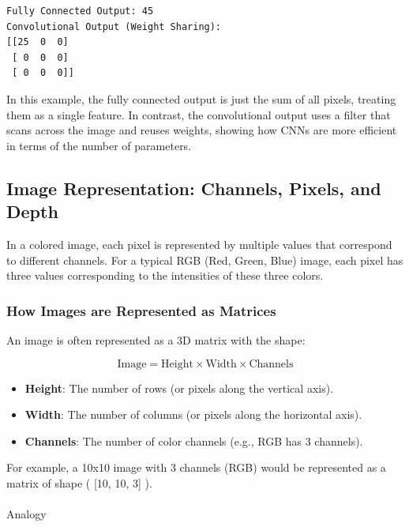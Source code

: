 \documentclass[
  letterpaper,
  DIV=11,
  numbers=noendperiod]{scrreprt}
\makeatletter
\let\oldparagraph\paragraph
\renewcommand{\paragraph}{
    \@ifstar
      \xxxParagraphStar
      \xxxParagraphNoStar
  }
\newcommand{\xxxParagraphStar}[1]{\oldparagraph*{#1}\mbox{}}
\newcommand{\xxxParagraphNoStar}[1]{\oldparagraph{#1}\mbox{}}
\providecommand{\tightlist}{%
  \setlength{\itemsep}{0pt}\setlength{\parskip}{0pt}}\usepackage{longtable,booktabs,array}
\makeatother
\begin{document}
\begin{verbatim}
Fully Connected Output: 45
Convolutional Output (Weight Sharing):
[[25  0  0]
 [ 0  0  0]
 [ 0  0  0]]
\end{verbatim}

In this example, the fully connected output is just the sum of all
pixels, treating them as a single feature. In contrast, the
convolutional output uses a filter that scans across the image and
reuses weights, showing how CNNs are more efficient in terms of the
number of parameters.

\subsection{Image Representation: Channels, Pixels, and
Depth}\label{image-representation-channels-pixels-and-depth}

In a colored image, each pixel is represented by multiple values that
correspond to different channels. For a typical RGB (Red, Green, Blue)
image, each pixel has three values corresponding to the intensities of
these three colors.

\subsubsection{How Images are Represented as
Matrices}\label{how-images-are-represented-as-matrices}

An image is often represented as a 3D matrix with the shape:

\[
\text{Image} = \text{Height} \times \text{Width} \times \text{Channels}
\]

\begin{itemize}
\tightlist
\item
  \textbf{Height}: The number of rows (or pixels along the vertical
  axis).
\item
  \textbf{Width}: The number of columns (or pixels along the horizontal
  axis).
\item
  \textbf{Channels}: The number of color channels (e.g., RGB has 3
  channels).
\end{itemize}

For example, a 10x10 image with 3 channels (RGB) would be represented as
a matrix of shape ( {[}10, 10, 3{]} ).

\paragraph{Analogy}\label{analogy-1}
\end{document}
